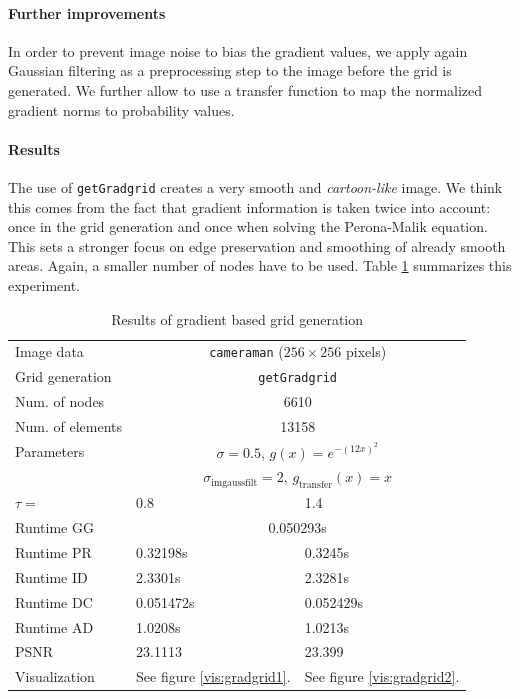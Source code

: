 \documentclass{report}
\begin{document}
\paragraph{Further improvements}

In order to prevent image noise to bias the gradient values, we apply again Gaussian filtering as a preprocessing step to the image before the grid is generated. We further allow to use a transfer function to map the normalized gradient norms to probability values.

\paragraph{Results}

The use of \texttt{getGradgrid} creates a very smooth and \emph{cartoon-like} image. We think this comes from the fact that gradient information is taken twice into account: once in the grid generation and once when solving the Perona-Malik equation. This sets a stronger focus on edge preservation and smoothing of already smooth areas. Again, a smaller number of nodes have to be used. Table \ref{res:gradgrid} summarizes this experiment.

\begin{table}[h]
	\centering
	\begin{tabular}{|lll}
		Image data & \multicolumn{2}{c}{\texttt{cameraman} ($256 \times 256$ pixels)} \\
		Grid generation & \multicolumn{2}{c}{\texttt{getGradgrid}} \\
		Num. of nodes & \multicolumn{2}{c}{6610} \\
		Num. of elements & \multicolumn{2}{c}{13158} \\
		Parameters & \multicolumn{2}{c}{$\sigma=0.5$, $g(x) = e^{-(12 x)^2}$} \\
		& \multicolumn{2}{c}{$\sigma_\text{imgaussfilt}=2$, $g_\text{transfer}(x) = x$}\\
		$\tau=$ & 0.8 & 1.4 \\
		Runtime GG & \multicolumn{2}{c}{0.050293s} \\
		Runtime PR & 0.32198s & 0.3245s \\
		Runtime ID & 2.3301s & 2.3281s\\
		Runtime DC & 0.051472s & 0.052429s \\
		Runtime AD & 1.0208s & 1.0213s \\
		PSNR & 23.1113 & 23.399 \\
		Visualization & See figure \ref{vis:gradgrid1}. & See figure \ref{vis:gradgrid2}. \\
	\end{tabular}
	\caption{Results of gradient based grid generation}
	\label{res:gradgrid}
\end{table}
\end{document}
